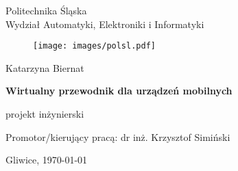 


\pagestyle{empty}
\sffamily

\noindent
\begin{center}
    \Large
    Politechnika Śląska\\
    Wydział Automatyki, Elektroniki i Informatyki
\end{center}

\begin{figure}[h]
\begin{center}
\texttt{[image: images/polsl.pdf]}
\end{center}
\end{figure}

\vfill\vfill
\begin{center}
    \Large
    Katarzyna Biernat
\end{center}

\vfill
\begin{center}
    \Huge\bfseries
    Wirtualny przewodnik dla urządzeń mobilnych
\end{center}

\vfill
\begin{center}
    \Large
    projekt inżynierski
\end{center}

\vfill\vfill\vfill
\begin{center}
    \Large
    Promotor/kierujący pracą: dr inż. Krzysztof Simiński
\end{center}

\vfill
\begin{center}
\large
   Gliwice, \today
\end{center}

\cleardoublepage


\rmfamily
\normalfont

\pagestyle{headings}
\tableofcontents



